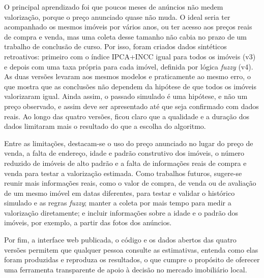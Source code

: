 \documentclass[
  article,
  a4paper,
  12pt,
  fleqn,
  oneside,
  chapter = TITLE,
  section = TITLE,
]{abntex2}
\begin{document}
O principal aprendizado foi que poucos meses de anúncios não medem valorização, porque o preço anunciado quase não muda. O ideal seria ter acompanhado os mesmos imóveis por vários anos, ou ter acesso aos preços reais de compra e venda, mas uma coleta desse tamanho não cabia no prazo de um trabalho de conclusão de curso. Por isso, foram criados dados sintéticos retroativos: primeiro com o índice IPCA+INCC igual para todos os imóveis (v3) e depois com uma taxa própria para cada imóvel, definida por lógica \textit{fuzzy} (v4). As duas versões levaram aos mesmos modelos e praticamente ao mesmo erro, o que mostra que as conclusões não dependem da hipótese de que todos os imóveis valorizaram igual. Ainda assim, o passado simulado é uma hipótese, e não um preço observado, e assim deve ser apresentado até que seja confirmado com dados reais. Ao longo das quatro versões, ficou claro que a qualidade e a duração dos dados limitaram mais o resultado do que a escolha do algoritmo.

Entre as limitações, destacam-se o uso do preço anunciado no lugar do preço de venda, a falta de endereço, idade e padrão construtivo dos imóveis, o número reduzido de imóveis de alto padrão e a falta de informações reais de compra e venda para testar a valorização estimada. Como trabalhos futuros, sugere-se reunir mais informações reais, como o valor de compra, de venda ou de avaliação de um mesmo imóvel em datas diferentes, para testar e validar o histórico simulado e as regras \textit{fuzzy}; manter a coleta por mais tempo para medir a valorização diretamente; e incluir informações sobre a idade e o padrão dos imóveis, por exemplo, a partir das fotos dos anúncios.

Por fim, a interface web publicada, o código e os dados abertos das quatro versões permitem que qualquer pessoa consulte as estimativas, entenda como elas foram produzidas e reproduza os resultados, o que cumpre o propósito de oferecer uma ferramenta transparente de apoio à decisão no mercado imobiliário local.

\postextual
\printbibliography
\end{document}
